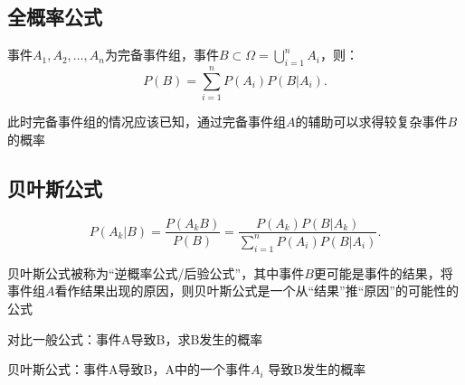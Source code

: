 \subsection{全概率公式}%
\label{sub:全概率公式}
\begin{cor}
    事件$A_1,A_2,\ldots,A_n$为完备事件组，事件$B\subset \Omega=\bigcup_{i=1}^{n}A_i$，则：\[
        P\left( B \right) =\sum_{i=1}^{n} P\left( A_i \right) P\left( B|A_i \right) 
    .\] 
\end{cor}
\begin{notation}
    此时完备事件组的情况应该已知，通过完备事件组$A$的辅助可以求得较复杂事件$B$的概率
\end{notation}
\subsection{贝叶斯公式}%
\label{sub:贝叶斯公式}
\begin{cor}
    \[
        P\left( A_{k}|B \right) =\frac{P\left( A_{k}B \right) }{P\left( B \right) }=\frac{P\left( A_{k} \right) P\left( B|A_k \right) }{\displaystyle{\sum_{i=1}^{n}} P\left( A_i \right) P\left( B|A_i \right)}
    .\] 
\end{cor}
贝叶斯公式被称为“逆概率公式/后验公式”，其中事件$B$更可能是事件的结果，将事件组$A$看作结果出现的原因，则贝叶斯公式是一个从“结果”推“原因”的可能性的公式

\begin{notation}
    对比一般公式：事件A导致B，求B发生的概率

    贝叶斯公式：事件A导致B，A中的一个事件$A_i$ 导致B发生的概率
\end{notation}


